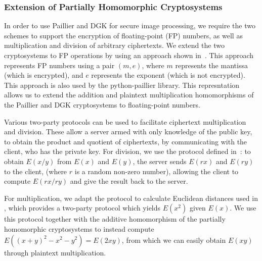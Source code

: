 \subsubsection{Extension of Partially Homomorphic Cryptosystems}
\label{sssec:pheextension}
In order to use Paillier and DGK for secure image processing, we require the two schemes to support the encryption of floating-point (FP) numbers, as well as multiplication and division of arbitrary ciphertexts. We extend the two cryptosystems to FP operations by using an approach shown in~\cite{ziad_cryptoimg:_2016}. This approach represents FP numbers using a pair $(m,e)$, where $m$ represents the mantissa (which is encrypted), and $e$ represents the exponent (which is not encrypted). This approach is also used by the python-paillier library. This represntation allows us to extend the addition and plaintext multiplication homomorphisms of the Paillier and DGK cryptosystems to floating-point numbers.

Various two-party protocols can be used to facilitate ciphertext multiplication and division. These allow a server armed with only knowledge of the public key, to obtain the product and quotient of ciphertexts, by communicating with the client, who has the private key. For division, we use the protocol defined in~\cite{boukoros_lightweight_2017}: to obtain $E(x/y)$ from $E(x)$ and $E(y)$, the server sends $E(rx)$ and $E(ry)$ to the client, (where $r$ is a random non-zero number), allowing the client to compute $E(rx/ry)$ and give the result back to the server.

For multiplication, we adapt the protocol to calculate Euclidean distances used in \cite{hutchison_privacy-preserving_2009}, which provides a two-party protocol which yields $E(x^2)$ given $E(x)$. We use this protocol together with the additive homomorphism of the partially homomorphic cryptosystems to instead compute $E((x + y)^2 - x^2 - y^2) = E(2xy)$, from which we can easily obtain $E(xy)$ through plaintext multiplication.


